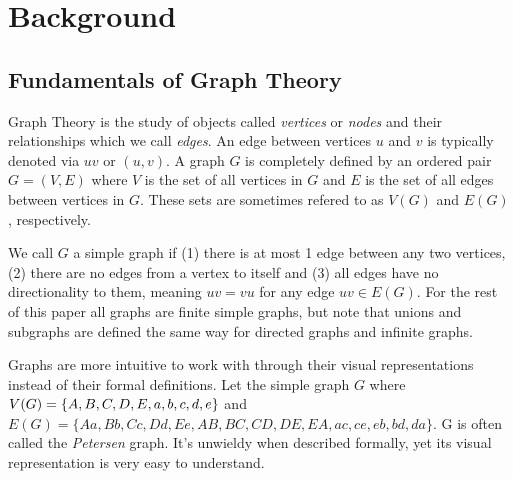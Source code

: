 \chapter{Background}\label{chap:Background}

\section{Fundamentals of Graph Theory}

Graph Theory is the study of objects called \textit{vertices} or \textit{nodes} and their relationships which we call \textit{edges}. An edge between vertices $u$ and $v$ is typically denoted via $uv$ or $(u,v)$. A graph $G$ is completely defined by an ordered pair $G = (V,E)$ where $V$ is the set of all vertices in $G$ and $E$ is the set of all edges between vertices in $G$. These sets are sometimes refered to as $V(G)$ and $E(G)$, respectively.

We call $G$ a simple graph if (1) there is at most 1 edge between any two vertices, (2) there are no edges from a vertex to itself and (3) all edges have no directionality to them, meaning $uv=vu$ for any edge $uv\in E(G)$. For the rest of this paper all graphs are finite simple graphs, but note that unions and subgraphs are defined the same way for directed graphs and infinite graphs.

Graphs are more intuitive to work with through their visual representations instead of their formal definitions. Let the simple graph $G$ where $V(G)=\{A,B,C,D,E,a,b,c,\newline d, e\}$ and $E(G)=\{Aa,Bb,Cc,Dd,Ee,AB,BC,CD,DE,EA,ac,ce,eb,bd,da\}$. G is often called the \textit{Petersen} graph. It's unwieldy when described formally, yet its visual representation is very easy to understand.

